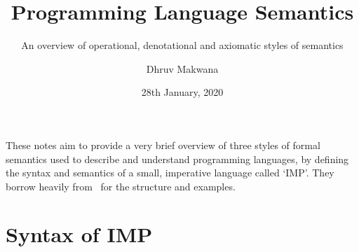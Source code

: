 \usepackage{proof}
\usepackage{ebproof}
\usepackage{listings}
\usepackage{natbib}

\title{Programming Language Semantics}
\subtitle{An overview of operational, denotational and axiomatic styles of semantics}
\date{28th January, 2020}
\author{Dhruv Makwana}

\graphicspath{{./graphics/}}


\addtolength{\jot}{0.5\baselineskip}
\setlength{\parskip}{0.5\baselineskip}

\newcommand{\den}[2]{ \mathcal{#1} [\![ #2 ]\!] }%
\newcommand{\denA}[1]{ \den{A}{#1} }%
\newcommand{\denB}[1]{ \den{B}{#1} }%
\newcommand{\denC}[1]{ \den{C}{#1} }%

\newcommand{\progNot}{\mathop{!}}
\newcommand{\doubleAmp}{\mathbin{\&\!\&}}
\newcommand{\doubleBar}{\mathbin{\mathbf{||}}}



\maketitle

\mode*  %
\setlength\parindent{0pt}

These notes aim to provide a very brief overview of three styles of formal
semantics used to describe and understand programming languages, by
defining the syntax and semantics of a small, imperative language called `IMP'.
They borrow heavily from~\citet{winskel1993formal} for the structure and
examples.

\section{Syntax of IMP}

